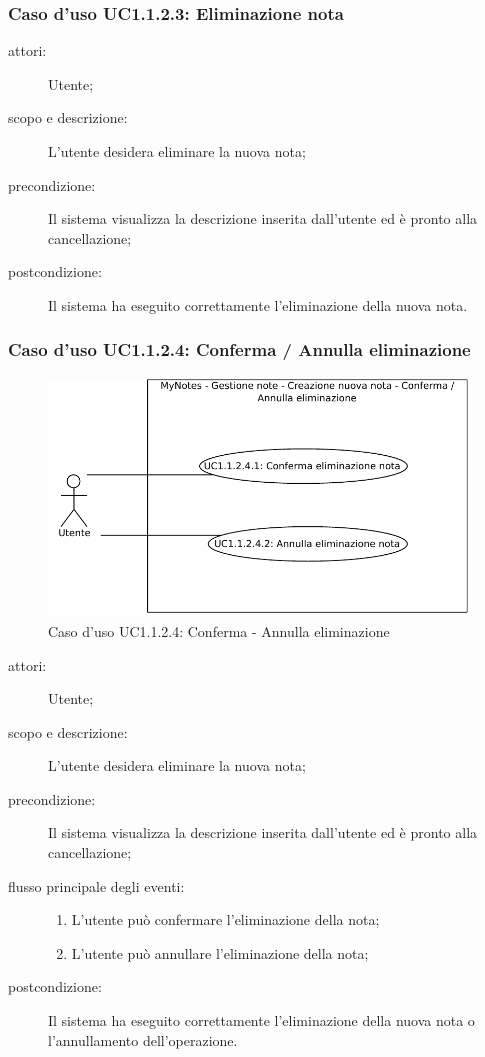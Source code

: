 \subsubsection{Caso d'uso UC1.1.2.3: Eliminazione nota}
\begin{description}
\item[attori:] Utente;
\item[scopo e descrizione:] L'utente desidera eliminare la nuova nota;
\item[precondizione:] Il sistema visualizza la descrizione inserita dall'utente ed è pronto alla cancellazione;
\item[postcondizione:] Il sistema ha eseguito correttamente l'eliminazione della nuova nota.
\end{description}

\subsubsection{Caso d'uso UC1.1.2.4: Conferma / Annulla eliminazione}
\begin{figure}[htb]
\centering
\includegraphics[scale=0.6]{gfx/useCase/MN_UC1-1-2-4_Conferma-Annulla_eliminazione.pdf}
\caption{Caso d'uso UC1.1.2.4: Conferma - Annulla eliminazione}
\label{fig:My notes UC1.1.2.4}
\end{figure}

\begin{description}
\item[attori:] Utente;
\item[scopo e descrizione:] L'utente desidera eliminare la nuova nota;
\item[precondizione:] Il sistema visualizza la descrizione inserita dall'utente ed è pronto alla cancellazione;
\item[flusso principale degli eventi:] \hfill
	\begin{enumerate}
	\item L'utente può confermare l'eliminazione della nota;
	\item L'utente può annullare l'eliminazione della nota;
	\end{enumerate}
\item[postcondizione:] Il sistema ha eseguito correttamente l'eliminazione della nuova nota o l'annullamento dell'operazione.
\end{description}

